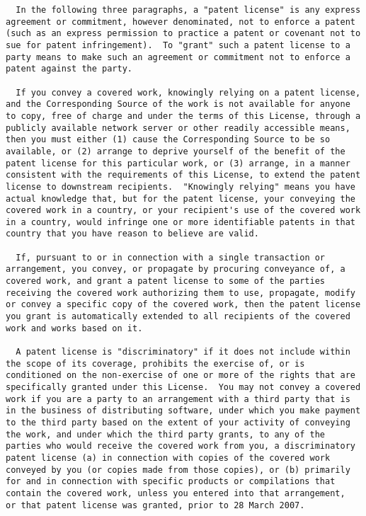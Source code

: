 \documentclass[11pt]{article}
\begin{document}
\begin{verbatim}
  In the following three paragraphs, a "patent license" is any express
agreement or commitment, however denominated, not to enforce a patent
(such as an express permission to practice a patent or covenant not to
sue for patent infringement).  To "grant" such a patent license to a
party means to make such an agreement or commitment not to enforce a
patent against the party.

  If you convey a covered work, knowingly relying on a patent license,
and the Corresponding Source of the work is not available for anyone
to copy, free of charge and under the terms of this License, through a
publicly available network server or other readily accessible means,
then you must either (1) cause the Corresponding Source to be so
available, or (2) arrange to deprive yourself of the benefit of the
patent license for this particular work, or (3) arrange, in a manner
consistent with the requirements of this License, to extend the patent
license to downstream recipients.  "Knowingly relying" means you have
actual knowledge that, but for the patent license, your conveying the
covered work in a country, or your recipient's use of the covered work
in a country, would infringe one or more identifiable patents in that
country that you have reason to believe are valid.

  If, pursuant to or in connection with a single transaction or
arrangement, you convey, or propagate by procuring conveyance of, a
covered work, and grant a patent license to some of the parties
receiving the covered work authorizing them to use, propagate, modify
or convey a specific copy of the covered work, then the patent license
you grant is automatically extended to all recipients of the covered
work and works based on it.

  A patent license is "discriminatory" if it does not include within
the scope of its coverage, prohibits the exercise of, or is
conditioned on the non-exercise of one or more of the rights that are
specifically granted under this License.  You may not convey a covered
work if you are a party to an arrangement with a third party that is
in the business of distributing software, under which you make payment
to the third party based on the extent of your activity of conveying
the work, and under which the third party grants, to any of the
parties who would receive the covered work from you, a discriminatory
patent license (a) in connection with copies of the covered work
conveyed by you (or copies made from those copies), or (b) primarily
for and in connection with specific products or compilations that
contain the covered work, unless you entered into that arrangement,
or that patent license was granted, prior to 28 March 2007.


\end{verbatim}
\end{document}
